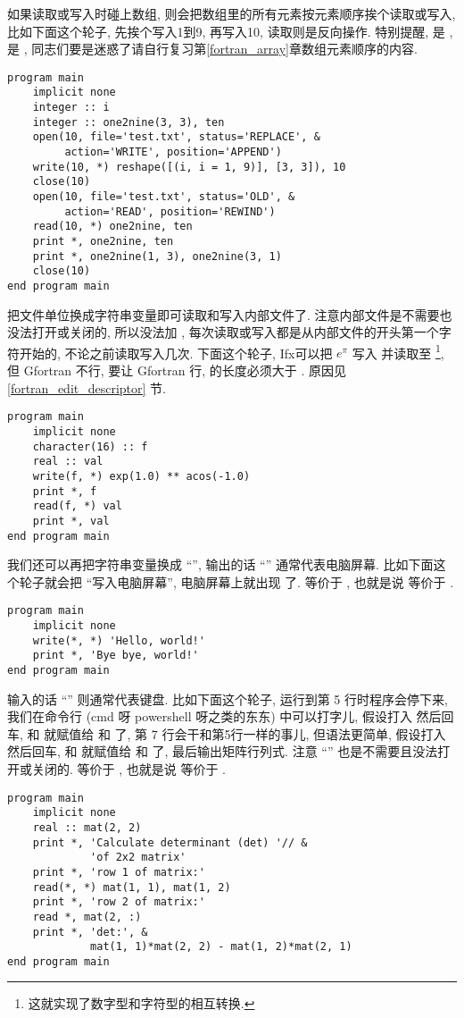 如果读取或写入时碰上数组, 则会把数组里的所有元素按元素顺序挨个读取或写入, 比如下面这个轮子, 先挨个写入1到9, 再写入10, 读取则是反向操作. 特别提醒,  是 ,  是 , 同志们要是迷惑了请自行复习第\ref{fortran_array}章数组元素顺序的内容. 
\begin{lstlisting}
program main
    implicit none
    integer :: i
    integer :: one2nine(3, 3), ten
    open(10, file='test.txt', status='REPLACE', &
         action='WRITE', position='APPEND')
    write(10, *) reshape([(i, i = 1, 9)], [3, 3]), 10
    close(10)
    open(10, file='test.txt', status='OLD', &
         action='READ', position='REWIND')
    read(10, *) one2nine, ten
    print *, one2nine, ten
    print *, one2nine(1, 3), one2nine(3, 1)
    close(10)
end program main
\end{lstlisting}

把文件单位换成字符串变量即可读取和写入内部文件了. 注意内部文件是不需要也没法打开或关闭的, 所以没法加 , 每次读取或写入都是从内部文件的开头第一个字符开始的, 不论之前读取写入几次. 下面这个轮子, Ifx可以把 $ e^\pi $ 写入  并读取至 \footnote{这就实现了数字型和字符型的相互转换.}, 但 Gfortran 不行, 要让 Gfortran 行,  的长度必须大于 . 原因见 \ref{fortran_edit_descriptor} 节. \label{internal_file}
\begin{lstlisting}
program main
    implicit none
    character(16) :: f
    real :: val
    write(f, *) exp(1.0) ** acos(-1.0)
    print *, f
    read(f, *) val
    print *, val
end program main
\end{lstlisting}

我们还可以再把字符串变量换成 ``\ttt{*}'', 输出的话 ``\ttt{*}'' 通常代表电脑屏幕. 比如下面这个轮子就会把  ``写入电脑屏幕'', 电脑屏幕上就出现  了.  等价于 , 也就是说  等价于 .
\begin{lstlisting}
program main
    implicit none
    write(*, *) 'Hello, world!'
    print *, 'Bye bye, world!'
end program main
\end{lstlisting}
输入的话 ``\ttt{*}'' 则通常代表键盘. 比如下面这个轮子, 运行到第 5 行时程序会停下来, 我们在命令行 (cmd 呀 powershell 呀之类的东东) 中可以打字儿, 假设打入  然后回车,  和  就赋值给  和  了, 第 7 行会干和第5行一样的事儿, 但语法更简单, 假设打入  然后回车,  和  就赋值给  和  了, 最后输出矩阵行列式. 注意 ``\ttt{*}'' 也是不需要且没法打开或关闭的.  等价于 , 也就是说  等价于 .
\begin{lstlisting}
program main
    implicit none
    real :: mat(2, 2)
    print *, 'Calculate determinant (det) '// &
             'of 2x2 matrix'
    print *, 'row 1 of matrix:'
    read(*, *) mat(1, 1), mat(1, 2)
    print *, 'row 2 of matrix:'
    read *, mat(2, :)
    print *, 'det:', &
             mat(1, 1)*mat(2, 2) - mat(1, 2)*mat(2, 1)
end program main
\end{lstlisting}

